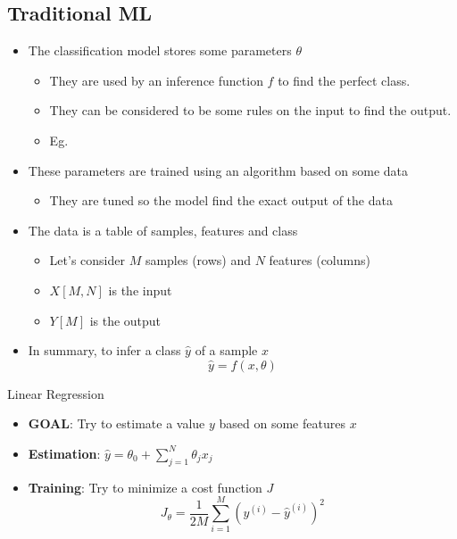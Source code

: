 \documentclass{KBook}
\begin{document}
\subsection{Traditional ML}

	
	\begin{itemize}
		\item The classification model stores some parameters $\theta$
		\begin{itemize}
			\item They are used by an inference function $ f $ to find the perfect class.
			\item They can be considered to be some rules on the input to find the output.
			\item Eg. 
		\end{itemize}
		\item These parameters are trained using an algorithm based on some data
		\begin{itemize}
			\item They are tuned so the model find the exact output of the data
		\end{itemize}
		\item The data is a table of samples, features and class
		\begin{itemize}
			\item Let's consider $ M $ samples (rows) and $ N $ features (columns)
			\item $ X[M, N] $ is the input
			\item $ Y[M] $ is the output
		\end{itemize}
		\item In summary, to infer a class $ \hat{y} $ of a sample $ x $
		\[\hat{y} = f(x, \theta)\]
	\end{itemize}
	
	
	Linear Regression
	
	\begin{minipage}{0.62\textwidth} 
		\begin{itemize}
			\item \textbf{GOAL}: Try to estimate a value $ y $ based on some features $ x $
			\item \textbf{Estimation}: $ \hat{y} = \theta_0 + \sum_{j=1}^{N} \theta_j x_j $
			\item \textbf{Training}: Try to minimize a cost function $ J $
			\[J_\theta = \frac{1}{2M} \sum\limits_{i=1}^{M} (y^{(i)} - \hat{y}^{(i)})^2\]
		\end{itemize}
	\end{minipage}
	\begin{minipage}{0.37\textwidth} 
	\end{minipage}
	
\end{document}
